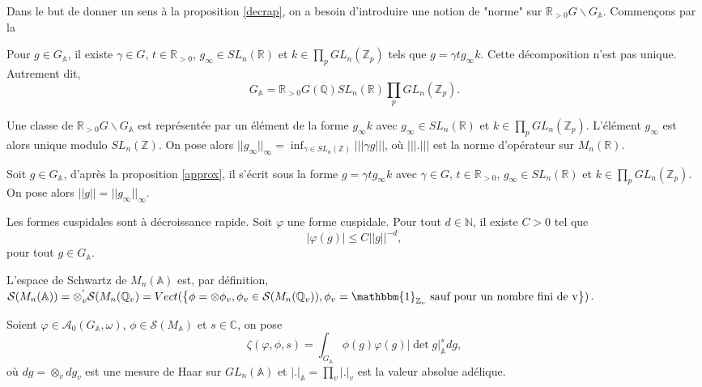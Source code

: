 Dans le but de donner un sens à la proposition \ref{decrap}, on a besoin d'introduire une notion de "norme" sur $\mathbb{R}_{> 0}G\backslash G_\mathbb{A}$. Commençons par la
\begin{proposition}
\label{approx}
Pour $g \in G_\mathbb{A}$, il existe $\gamma \in G$, $t \in \mathbb{R}_{>0}$, $g_\infty \in SL_n(\mathbb{R})$ et $k \in \prod_p GL_n(\mathbb{Z}_p)$ tels que $g = \gamma t g_\infty k$. Cette décomposition n'est pas unique. Autrement dit,
\begin{equation}
G_\mathbb{A} = \mathbb{R}_{> 0}G(\mathbb{Q}) SL_n(\mathbb{R}) \prod_p GL_n(\mathbb{Z}_p).
\end{equation}
\end{proposition}

Une classe de $\mathbb{R}_{> 0}G\backslash G_\mathbb{A}$ est représentée par un élément de la forme $g_\infty k$ avec $g_\infty \in SL_n(\mathbb{R})$ et $k \in \prod_p GL_n(\mathbb{Z}_p)$. L'élément $g_\infty$ est alors unique modulo $SL_n(\mathbb{Z})$. On pose alors $||g_\infty||_\infty = \inf_{\gamma \in SL_n(\mathbb{Z})} |||\gamma g|||$, où $|||.|||$ est la norme d'opérateur sur $M_n(\mathbb{R})$.

Soit $g \in G_\mathbb{A}$, d'après la proposition \ref{approx}, il s'écrit sous la forme $g=\gamma t g_\infty k$ avec $\gamma \in G$, $t \in \mathbb{R}_{>0}$, $g_\infty \in SL_n(\mathbb{R})$ et $k \in \prod_p GL_n(\mathbb{Z}_p)$. On pose alors $||g|| = ||g_\infty||_\infty$.

\begin{proposition}
\label{decrap}
Les formes cuspidales sont à décroissance rapide. Soit $\varphi$ une forme cuspidale. Pour tout $d \in \mathbb{N}$, il existe $C > 0$ tel que
\begin{equation}
|\varphi(g)| \leq C||g||^{-d},
\end{equation}
pour tout $g \in G_{\mathbb{A}}$.
\end{proposition}

L'espace de Schwartz de $M_n(\mathbb{A})$ est, par définition, $\mathcal{S}(M_n(\mathbb{A}))=\otimes_v^{'} \mathcal{S}(M_n(\mathbb{Q}_v)=Vect(\left\lbrace \phi = \otimes \phi_v, \phi_v \in \mathcal{S}(M_n(\mathbb{Q}_v)), \phi_v = \mathbbm{1}_{\mathbb{Z}_v} \text{ sauf pour un nombre fini de v} \right\rbrace)$.

\begin{definition}
Soient $\varphi \in \mathcal{A}_0(G_\mathbb{A}, \omega)$, $\phi \in \mathcal{S}(M_\mathbb{A})$ et $s \in \mathbb{C}$, on pose
\begin{equation}
\zeta(\varphi, \phi, s) = \int_{G_\mathbb{A}} \phi(g) \varphi(g) |\det g|_\mathbb{A}^s dg,
\end{equation}
où $dg = \otimes_v dg_v$ est une mesure de Haar sur $GL_n(\mathbb{A})$ et $|.|_\mathbb{A} = \prod_v |.|_v$ est la valeur absolue adélique.
\end{definition}

